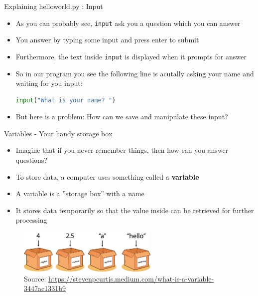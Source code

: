 \documentclass[10pt,xcolor={table,dvipsnames},t]{beamer}
\begin{document}
\begin{frame}[fragile]{Explaining helloworld.py : Input}
  \begin{itemize}
    \item As you can probably see, \texttt{input} ask you a question which you can answer 
    \item You answer by typing some input and press enter to submit
    \item Furthermore, the text inside \texttt{input} is displayed when it prompts for answer
    \item So in our program you see the following line is acutally asking your name and waiting for you input:
    \begin{lstlisting}[language=python]
      input("What is your name? ")
\end{lstlisting}
    \item But here is a problem: How can we save and manipulate these input?
  \end{itemize}
\end{frame}
\begin{frame}{Variables - Your handy storage box}
  \begin{itemize}
    \item Imagine that if you never remember things, then how can you answer questions?
    \item To store data, a computer uses something called a \textbf{variable}
    \item A variable is a ”storage box” with a name
    \item It stores data temporarily so that the value inside can be retrieved for further processing
  \end{itemize}
  \begin{figure}
    \centering 
    \includegraphics[width=0.6\textwidth]{img/variable.png}
    \caption*{Source: \href{https://stevenpcurtis.medium.com/what-is-a-variable-3447ac1331b9}{https://stevenpcurtis.medium.com/what-is-a-variable-3447ac1331b9}}
  \end{figure}
\end{frame}
\end{document}
